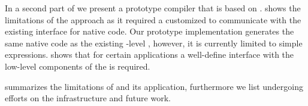 \begin{description}
	In a second part of  we present \NBJ a prototype \JIT compiler that is based on \B.
	\NBJ shows the limitations of the \B approach as it required a customized \VM to communicate with the existing \JIT interface for native code.
	Our prototype implementation generates the same native code as the existing \VM-level \JIT, however, it is currently limited to simple expressions.
	\NBJ shows that for certain applications a well-define interface with the low-level components of the \VM is required.
	
	\item[\chapref{future}] summarizes the limitations of \B and its application, furthermore we list undergoing efforts on the \B infrastructure and future work.
\end{description}



